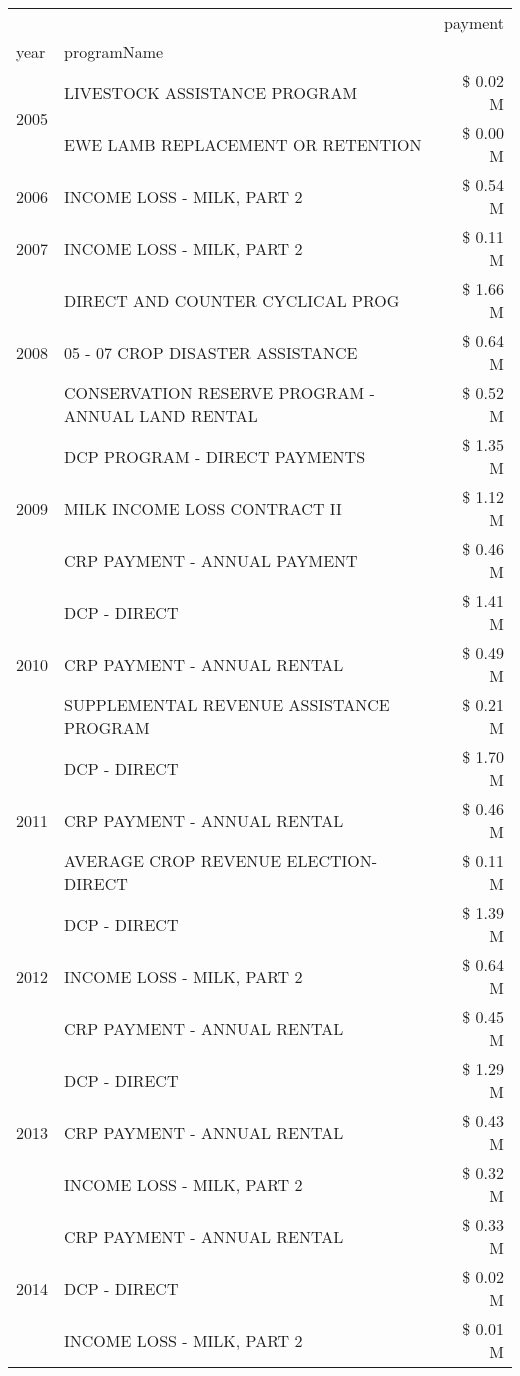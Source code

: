 \begin{tabular}{llr}
\toprule
 &  & payment \\
year & programName &  \\
\midrule
\multirow[t]{2}{*}{2005} & LIVESTOCK ASSISTANCE PROGRAM & \$ 0.02 M \\
 & EWE LAMB REPLACEMENT OR RETENTION & \$ 0.00 M \\
\cline{1-3}
2006 & INCOME LOSS - MILK, PART 2 & \$ 0.54 M \\
\cline{1-3}
2007 & INCOME LOSS - MILK, PART 2 & \$ 0.11 M \\
\cline{1-3}
\multirow[t]{3}{*}{2008} & DIRECT AND COUNTER CYCLICAL PROG & \$ 1.66 M \\
 & 05 - 07 CROP DISASTER ASSISTANCE & \$ 0.64 M \\
 & CONSERVATION RESERVE PROGRAM - ANNUAL LAND RENTAL & \$ 0.52 M \\
\cline{1-3}
\multirow[t]{3}{*}{2009} & DCP PROGRAM - DIRECT PAYMENTS & \$ 1.35 M \\
 & MILK INCOME LOSS CONTRACT II & \$ 1.12 M \\
 & CRP PAYMENT - ANNUAL PAYMENT & \$ 0.46 M \\
\cline{1-3}
\multirow[t]{3}{*}{2010} & DCP - DIRECT & \$ 1.41 M \\
 & CRP PAYMENT - ANNUAL RENTAL & \$ 0.49 M \\
 & SUPPLEMENTAL REVENUE ASSISTANCE PROGRAM & \$ 0.21 M \\
\cline{1-3}
\multirow[t]{3}{*}{2011} & DCP - DIRECT & \$ 1.70 M \\
 & CRP PAYMENT - ANNUAL RENTAL & \$ 0.46 M \\
 & AVERAGE CROP REVENUE ELECTION-DIRECT & \$ 0.11 M \\
\cline{1-3}
\multirow[t]{3}{*}{2012} & DCP - DIRECT & \$ 1.39 M \\
 & INCOME LOSS - MILK, PART 2 & \$ 0.64 M \\
 & CRP PAYMENT - ANNUAL RENTAL & \$ 0.45 M \\
\cline{1-3}
\multirow[t]{3}{*}{2013} & DCP - DIRECT & \$ 1.29 M \\
 & CRP PAYMENT - ANNUAL RENTAL & \$ 0.43 M \\
 & INCOME LOSS - MILK, PART 2 & \$ 0.32 M \\
\cline{1-3}
\multirow[t]{3}{*}{2014} & CRP PAYMENT - ANNUAL RENTAL & \$ 0.33 M \\
 & DCP - DIRECT & \$ 0.02 M \\
 & INCOME LOSS - MILK, PART 2 & \$ 0.01 M \\

\end{tabular}
